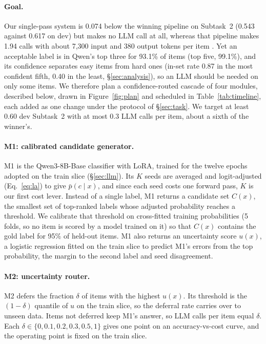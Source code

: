 \paragraph{Goal.}
Our single-pass system is 0.074 below the winning pipeline on Subtask~2 (0.543 against 0.617 on dev) but makes no LLM call at all, whereas that pipeline makes 1.94 calls with about 7,300 input and 380 output tokens per item \citep{shi-etal-2026-teleai}.
Yet an acceptable label is in Qwen's top three for 93.1\% of items (top five, 99.1\%), and its confidence separates easy items from hard ones (in-set rate 0.87 in the most confident fifth, 0.40 in the least, \S\ref{sec:analysis}), so an LLM should be needed on only some items.
We therefore plan a confidence-routed cascade of four modules, described below, drawn in Figure~\ref{fig:plan} and scheduled in Table~\ref{tab:timeline}, each added as one change under the protocol of \S\ref{sec:task}.
We target at least 0.60 dev Subtask~2 with at most 0.3 LLM calls per item, about a sixth of the winner's.

\paragraph{M1: calibrated candidate generator.}
M1 is the Qwen3-8B-Base classifier with LoRA, trained for the twelve epochs adopted on the train slice (\S\ref{sec:llm}).
Its $K$ seeds are averaged and logit-adjusted (Eq.~\ref{eq:la}) to give $\bar p(c \mid x)$, and since each seed costs one forward pass, $K$ is our first cost lever.
Instead of a single label, M1 returns a candidate set $C(x)$, the smallest set of top-ranked labels whose adjusted probability reaches a threshold.
We calibrate that threshold on cross-fitted training probabilities (5 folds, so no item is scored by a model trained on it) so that $C(x)$ contains the gold label for 95\% of held-out items.
M1 also returns an uncertainty score $u(x)$, a logistic regression fitted on the train slice to predict M1's errors from the top probability, the margin to the second label and seed disagreement.

\paragraph{M2: uncertainty router.}
M2 defers the fraction $\delta$ of items with the highest $u(x)$.
Its threshold is the $(1-\delta)$ quantile of $u$ on the train slice, so the deferral rate carries over to unseen data.
Items not deferred keep M1's answer, so LLM calls per item equal $\delta$.
Each $\delta \in \{0, 0.1, 0.2, 0.3, 0.5, 1\}$ gives one point on an accuracy-vs-cost curve, and the operating point is fixed on the train slice.

